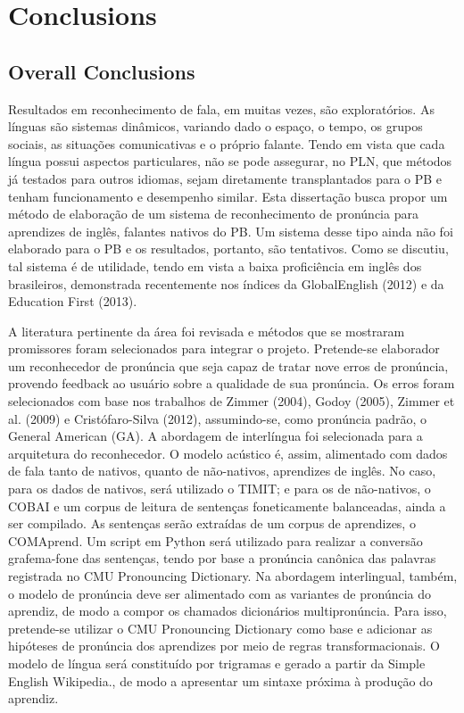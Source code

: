 \chapter{Conclusions}\label{ch:conclusions}

\section{Overall Conclusions}\label{sec:overall-conclusions}

Resultados em reconhecimento de fala, em muitas vezes, s\~ao
explorat\'orios. As l\'inguas s\~ao sistemas din\^amicos, variando dado o
espa\c{c}o, o tempo, os grupos sociais, as situa\c{c}\~oes comunicativas e o
pr\'oprio falante. Tendo em vista que cada l\'ingua possui aspectos
particulares, n\~ao se pode assegurar, no PLN, que m\'etodos j\'a testados
para outros idiomas, sejam diretamente transplantados para o PB e tenham
funcionamento e desempenho similar. Esta disserta\c{c}\~ao busca propor um
m\'etodo de elabora\c{c}\~ao de um sistema de reconhecimento de pron\'uncia para
aprendizes de ingl\^es, falantes nativos do PB. Um sistema desse tipo
ainda n\~ao foi elaborado para o PB e os resultados, portanto, s\~ao
tentativos. Como se discutiu, tal sistema \'e de utilidade, tendo em vista
a baixa profici\^encia em ingl\^es dos brasileiros, demonstrada recentemente
nos \'indices da GlobalEnglish (2012) e da Education First (2013).

A literatura pertinente da \'area foi revisada e m\'etodos que se mostraram
promissores foram selecionados para integrar o projeto. Pretende-se
elaborador um reconhecedor de pron\'uncia que seja capaz de tratar nove
erros de pron\'uncia, provendo feedback ao usu\'ario sobre a qualidade de
sua pron\'uncia. Os erros foram selecionados com base nos trabalhos de
Zimmer (2004), Godoy (2005), Zimmer et al. (2009) e Crist\'ofaro-Silva
(2012), assumindo-se, como pron\'uncia padr\~ao, o General American (GA). A
abordagem de interl\'ingua foi selecionada para a arquitetura do
reconhecedor. O modelo ac\'ustico \'e, assim, alimentado com dados de fala
tanto de nativos, quanto de n\~ao-nativos, aprendizes de ingl\^es. No caso,
para os dados de nativos, ser\'a utilizado o TIMIT; e para os de
n\~ao-nativos, o COBAI e um corpus de leitura de senten\c{c}as foneticamente
balanceadas, ainda a ser compilado. As senten\c{c}as ser\~ao extra\'idas de um
corpus de aprendizes, o COMAprend. Um script em Python ser\'a utilizado
para realizar a convers\~ao grafema-fone das senten\c{c}as, tendo por base a
pron\'uncia can\^onica das palavras registrada no CMU Pronouncing
Dictionary. Na abordagem interlingual, tamb\'em, o modelo de pron\'uncia
deve ser alimentado com as variantes de pron\'uncia do aprendiz, de modo a
compor os chamados dicion\'arios multipron\'uncia. Para isso, pretende-se
utilizar o CMU Pronouncing Dictionary como base e adicionar as hip\'oteses
de pron\'uncia dos aprendizes por meio de regras transformacionais. O
modelo de l\'ingua ser\'a constitu\'ido por trigramas e gerado a partir da
Simple English Wikipedia., de modo a apresentar um sintaxe pr\'oxima à
produ\c{c}\~ao do aprendiz.

